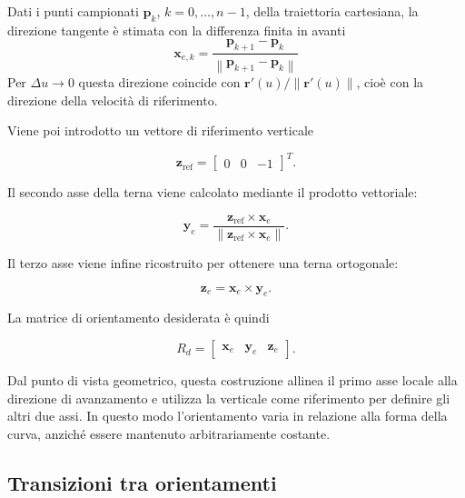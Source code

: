 Dati i punti campionati $\mathbf{p}_k$, $k=0,\ldots,n-1$, della traiettoria cartesiana, la direzione tangente è stimata con la differenza finita in
avanti
\begin{equation}
    \mathbf{x}_{e,k}=
    \frac{\mathbf{p}_{k+1}-\mathbf{p}_k}
    {\left\|\mathbf{p}_{k+1}-\mathbf{p}_k\right\|}
\end{equation}
Per $\Delta u\to 0$ questa
direzione coincide con $\mathbf{r}'(u)/\lVert\mathbf{r}'(u)\rVert$, cioè
con la direzione della velocità di riferimento.

Viene poi introdotto un vettore di riferimento verticale

\begin{equation}
    \mathbf{z}_{\mathrm{ref}}=
    \begin{bmatrix}
        0 & 0 & -1
    \end{bmatrix}^{T}.
\end{equation}

Il secondo asse della terna viene calcolato mediante il prodotto vettoriale:

\begin{equation}
    \mathbf{y}_e=
    \frac{\mathbf{z}_{\mathrm{ref}}\times\mathbf{x}_e}
    {\|\mathbf{z}_{\mathrm{ref}}\times\mathbf{x}_e\|}.
\end{equation}

Il terzo asse viene infine ricostruito per ottenere una terna ortogonale:

\begin{equation}
    \mathbf{z}_e=\mathbf{x}_e\times\mathbf{y}_e.
\end{equation}

La matrice di orientamento desiderata è quindi

\begin{equation}
    R_d=
    \begin{bmatrix}
        \mathbf{x}_e & \mathbf{y}_e & \mathbf{z}_e
    \end{bmatrix}.
    \label{eq:matrice_orientamento}
\end{equation}

Dal punto di vista geometrico, questa costruzione allinea il primo asse locale alla direzione di avanzamento e utilizza la verticale come riferimento per definire gli altri due assi. In questo modo l'orientamento varia in relazione alla forma della curva, anziché essere mantenuto arbitrariamente costante.

\subsection{Transizioni tra orientamenti}

